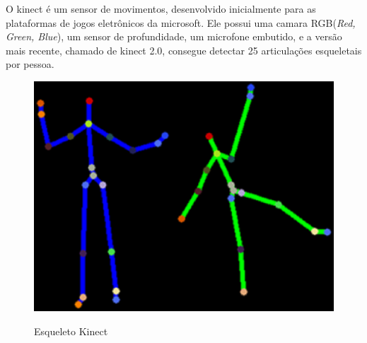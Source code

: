   O kinect é um sensor de movimentos, desenvolvido inicialmente para as plataformas
de jogos eletrônicos da microsoft. Ele possui uma camara RGB(\textit{Red, Green, Blue}),
um sensor de profundidade, um microfone embutido, e a versão mais recente, chamado de kinect 2.0, 
consegue detectar 25 articulações esqueletais por pessoa.

\begin{figure}[!h]                                                               
\centering                                                                         
\includegraphics [keepaspectratio=true,scale=0.60]{figuras/esqueletoKinect.eps}                                
\caption{Esqueleto Kinect}                                        
\cite{microsoftResearch}
\label{esqueletokinect}                                                        
\end{figure}                                                                    

